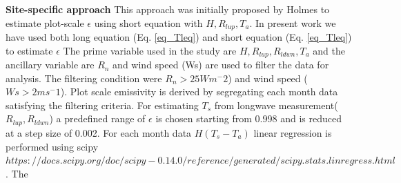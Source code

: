 \documentclass[fleqn,10pt]{wlscirep}
\begin{document}
{\textbf{Site-specific approach}
This approach was initially proposed by Holmes\cite{holmes_land_2009-1} to estimate plot-scale $\epsilon$ using short equation with $H, R_{lup},T_{a}$. In  present work we have used both long equation (Eq. \ref{eq_Tleq}) and short equation (Eq. \ref{eq_Tleq}) to estimate $\epsilon$
The prime variable used in the study are $H, R_{lup}, R_{ldwn},T_{a}$ and the ancillary variable are $R_{n}$ and wind speed (Ws) are used to filter the data for analysis. The filtering condition were $R_{n} > 25 Wm^-2$) and wind speed ($Ws > 2ms^-1$)\cite{holmes_land_2009}. Plot scale emissivity is derived by segregating each month data satisfying the filtering criteria. For estimating $T_{s}$ from longwave measurement($R_{lup},R_{ldwn}$) a predefined range of $\epsilon$ is chosen starting from 0.998 and is reduced at a step size of 0.002. For each month data $H (T_{s} - T_{a})$ linear regression is performed using scipy $https://docs.scipy.org/doc/scipy-0.14.0/reference/generated/scipy.stats.linregress.html$. The
}
\end{document}
